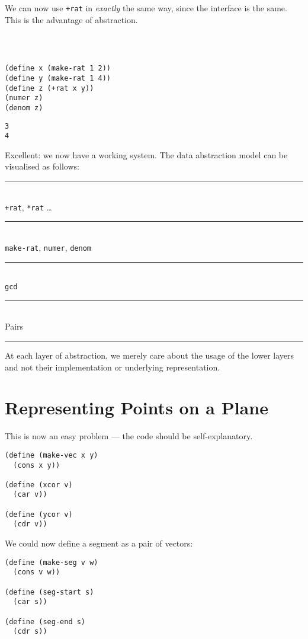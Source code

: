 \documentclass[9pt]{report}
\begin{document}
We can now use \texttt{+rat} in \emph{exactly} the same way, since the
interface is the same. This is the advantage of abstraction.

\begin{verbatim}



(define x (make-rat 1 2))
(define y (make-rat 1 4))
(define z (+rat x y))
(numer z)
(denom z)
\end{verbatim}

\begin{verbatim}
3
4
\end{verbatim}


Excellent: we now have a working system. The data abstraction
model can be visualised as follows:

\begin{center}
\rule{6cm}{2pt}\\
\texttt{+rat}, \texttt{*rat} \ldots{}\\
\rule{6cm}{2pt}\\
\texttt{make-rat}, \texttt{numer}, \texttt{denom}\\
\rule{6cm}{2pt}\\
\texttt{gcd}\\
\rule{6cm}{2pt}\\
Pairs\\
\rule{6cm}{2pt}
\end{center}

At each layer of abstraction, we merely care about the usage of
the lower layers and not their implementation or underlying
representation.

\section{Representing Points on a Plane}
\label{sec:org60d60d1}

This is now an easy problem --- the code should be
self-explanatory.

\begin{verbatim}
(define (make-vec x y)
  (cons x y))

(define (xcor v)
  (car v))

(define (ycor v)
  (cdr v))
\end{verbatim}

We could now define a segment as a pair of vectors:

\begin{verbatim}
(define (make-seg v w)
  (cons v w))

(define (seg-start s)
  (car s))

(define (seg-end s)
  (cdr s))
\end{verbatim}
\end{document}
